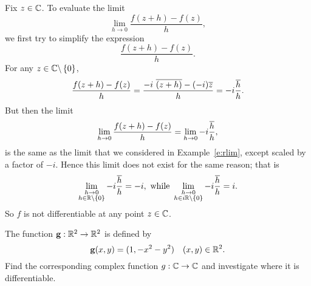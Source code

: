 \begin{solution}
Fix $z \in \mathbb{C}$. To evaluate the limit
\[
\lim_{h \to 0} \frac{f(z+h)-f(z)}{h},
\]
we first try to simplify the expression
\[
\frac{f(z+h)-f(z)}{h}.
\]
For any $z \in \mathbb{C} \backslash \left\{0\right\}$, 
\[
\frac{f(z+h)-f(z)}{h} = \frac{-i\ \conj{(z+h)}-(-i)\conj{z}}{h} = -i \frac{\conj{h}}{h}.
\]
But then the limit
\[
\lim_{h \to 0} \frac{f(z+h)-f(z)}{h} = \lim_{h \to 0} -i \frac{\overline{h}}{h},
\]
is the same as the limit that we considered in Example~\ref{e:rlim}, except scaled by a factor of $-i$.  Hence this limit does not exist for the same reason; that is
\[
\displaystyle \lim_{\substack{h \to 0 \\ h \in \mathbb{R} \backslash \left\{0\right\}}} -i \frac{\overline{h}}{h} = -i, \text{ while } \displaystyle \lim_{\substack{h \to 0 \\ h \in i\mathbb{R} \backslash \left\{0\right\}}} -i \frac{\overline{h}}{h} = i.
\]
So $f$ is not differentiable at any point $z \in \mathbb{C}$.
\end{solution}



\begin{example}
\label{e:diff2}
The function $\mathbf{g}: \mathbb{R}^2 \to \mathbb{R}^2$ is defined by
\[
\mathbf{g}(x,y)=(1,-x^2-y^2)\quad (x,y) \in \mathbb{R}^2.
\]
Find the corresponding complex function $g:\mathbb{C} \to \mathbb{C}$ and investigate where it is differentiable.
\end{example}

